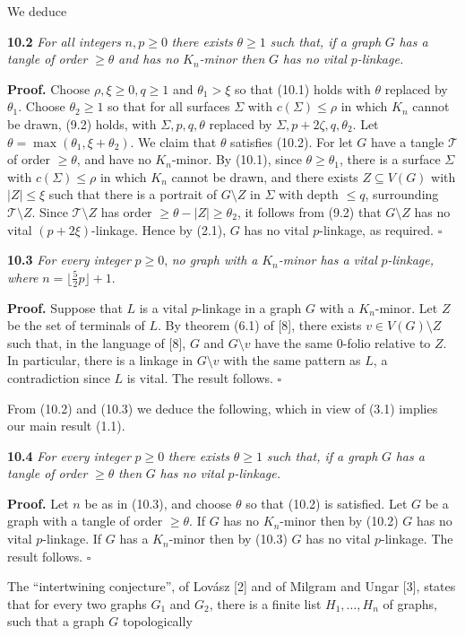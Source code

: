 We deduce

\textbf{10.2} \textit{For all integers} $n, p \ge 0$ \textit{there exists} $\theta \ge 1$ \textit{such that, if a graph} $G$ \textit{has a tangle of order} $\ge \theta$ \textit{and has no} $K_n$\textit{-minor then} $G$ \textit{has no vital} $p$\textit{-linkage.}

\textbf{Proof.} Choose $\rho, \xi \ge 0, q \ge 1$ and $\theta_1 > \xi$ so that (10.1) holds with $\theta$ replaced by $\theta_1$. Choose $\theta_2 \ge 1$ so that for all surfaces $\Sigma$ with $c(\Sigma) \le \rho$ in which $K_n$ cannot be drawn, (9.2) holds, with $\Sigma, p, q, \theta$ replaced by $\Sigma, p + 2\zeta, q, \theta_2$. Let $\theta = \max(\theta_1, \xi + \theta_2)$. We claim that $\theta$ satisfies (10.2). For let $G$ have a tangle $\mathcal{T}$ of order $\ge \theta$, and have no $K_n$-minor. By (10.1), since $\theta \ge \theta_1$, there is a surface $\Sigma$ with $c(\Sigma) \le \rho$ in which $K_n$ cannot be drawn, and there exists $Z \subseteq V(G)$ with $|Z| \le \xi$ such that there is a portrait of $G \setminus Z$ in $\Sigma$ with depth $\le q$, surrounding $\mathcal{T} \setminus Z$. Since $\mathcal{T} \setminus Z$ has order $\ge \theta - |Z| \ge \theta_2$, it follows from (9.2) that $G \setminus Z$ has no vital $(p + 2\xi)$-linkage. Hence by (2.1), $G$ has no vital $p$-linkage, as required. $\square$

\textbf{10.3} \textit{For every integer} $p \ge 0$, \textit{no graph with a} $K_n$\textit{-minor has a vital} $p$\textit{-linkage, where} $n = \lfloor\frac{5}{2}p\rfloor + 1$.

\textbf{Proof.} Suppose that $L$ is a vital $p$-linkage in a graph $G$ with a $K_n$-minor. Let $Z$ be the set of terminals of $L$. By theorem (6.1) of [8], there exists $v \in V(G) \setminus Z$ such that, in the language of [8], $G$ and $G \setminus v$ have the same $0$-folio relative to $Z$. In particular, there is a linkage in $G \setminus v$ with the same pattern as $L$, a contradiction since $L$ is vital. The result follows. $\square$

From (10.2) and (10.3) we deduce the following, which in view of (3.1) implies our main result (1.1).

\textbf{10.4} \textit{For every integer} $p \ge 0$ \textit{there exists} $\theta \ge 1$ \textit{such that, if a graph} $G$ \textit{has a tangle of order} $\ge \theta$ \textit{then} $G$ \textit{has no vital} $p$\textit{-linkage.}

\textbf{Proof.} Let $n$ be as in (10.3), and choose $\theta$ so that (10.2) is satisfied. Let $G$ be a graph with a tangle of order $\ge \theta$. If $G$ has no $K_n$-minor then by (10.2) $G$ has no vital $p$-linkage. If $G$ has a $K_n$-minor then by (10.3) $G$ has no vital $p$-linkage. The result follows. $\square$


The ``intertwining conjecture'', of Lov\'asz [2] and of Milgram and Ungar [3], states that for every two graphs $G_1$ and $G_2$, there is a finite list $H_1, \dots, H_n$ of graphs, such that a graph $G$ topologically
